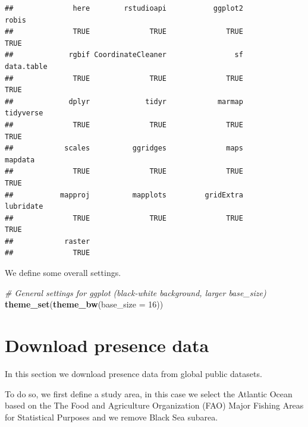 \documentclass[
]{book}
\newenvironment{Shaded}{\begin{snugshade}}{\end{snugshade}}
\newcommand{\AttributeTok}[1]{\textcolor[rgb]{0.13,0.29,0.53}{#1}}
\newcommand{\CommentTok}[1]{\textcolor[rgb]{0.56,0.35,0.01}{\textit{#1}}}
\newcommand{\DecValTok}[1]{\textcolor[rgb]{0.00,0.00,0.81}{#1}}
\newcommand{\FunctionTok}[1]{\textcolor[rgb]{0.13,0.29,0.53}{\textbf{#1}}}
\newcommand{\NormalTok}[1]{#1}
\begin{document}
\begin{verbatim}
##              here        rstudioapi           ggplot2             robis 
##              TRUE              TRUE              TRUE              TRUE 
##             rgbif CoordinateCleaner                sf        data.table 
##              TRUE              TRUE              TRUE              TRUE 
##             dplyr             tidyr            marmap         tidyverse 
##              TRUE              TRUE              TRUE              TRUE 
##            scales          ggridges              maps           mapdata 
##              TRUE              TRUE              TRUE              TRUE 
##           mapproj          mapplots         gridExtra         lubridate 
##              TRUE              TRUE              TRUE              TRUE 
##            raster 
##              TRUE
\end{verbatim}

We define some overall settings.

\begin{Shaded}
\begin{Highlighting}[]
\CommentTok{\# General settings for ggplot (black{-}white background, larger base\_size)}
\FunctionTok{theme\_set}\NormalTok{(}\FunctionTok{theme\_bw}\NormalTok{(}\AttributeTok{base\_size =} \DecValTok{16}\NormalTok{))}
\end{Highlighting}
\end{Shaded}

\section{Download presence data}\label{download-presence-data}

In this section we download presence data from global public datasets.

To do so, we first define a study area, in this case we select the Atlantic Ocean based on the The Food and Agriculture Organization (FAO) Major Fishing Areas for Statistical Purposes and we remove Black Sea subarea.
\end{document}
